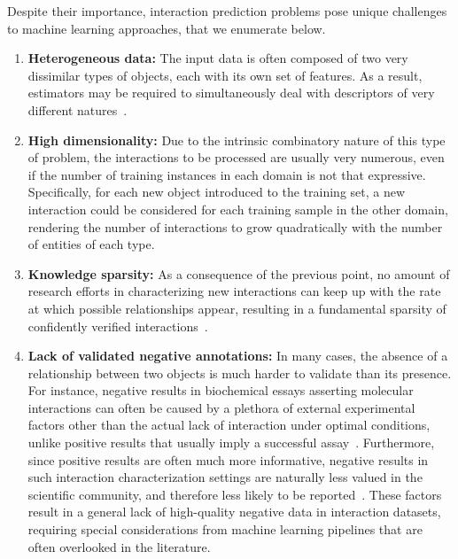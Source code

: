 Despite their importance, interaction prediction problems pose unique challenges to machine learning approaches, that we enumerate below.
%
\begin{enumerate}
    \item \textbf{Heterogeneous data:} The input data is often composed of two very dissimilar types of objects, each with its own set of features. As a result, estimators may be required to simultaneously deal with descriptors of very different natures~\cite{bagherian2020machine}.  %
    \item \textbf{High dimensionality:} Due to the intrinsic combinatory nature of this type of problem, the interactions to be processed are usually very numerous, even if the number of training instances in each domain is not that expressive.  %
    Specifically, for each new object introduced to the training set, a new interaction could be considered for each training sample in the other domain, rendering the number of interactions to grow quadratically with the number of entities of each type.
    \item \textbf{Knowledge sparsity:} As a consequence of the previous point, no amount of research efforts in characterizing new interactions can keep up with the rate at which possible relationships appear, resulting in a fundamental sparsity of confidently verified interactions~\cite{bagherian2020machine}. %
    \item \textbf{Lack of validated negative annotations:} In many cases, the absence of a relationship between two objects is much harder to validate than its presence. For instance, negative results in biochemical essays asserting molecular interactions can often be caused by a plethora of external experimental factors other than the actual lack of interaction under optimal conditions, unlike positive results that usually imply a successful assay~\cite{pahikkala2015more,chen2018machine,bagherian2020machine}. Furthermore, since positive results are often much more informative, negative results in such interaction characterization settings are naturally less valued in the scientific community, and therefore less likely to be reported~\cite{}. These factors result in a general lack of high-quality negative data in interaction datasets, requiring special considerations from machine learning pipelines that are often overlooked in the literature.

\end{enumerate}
